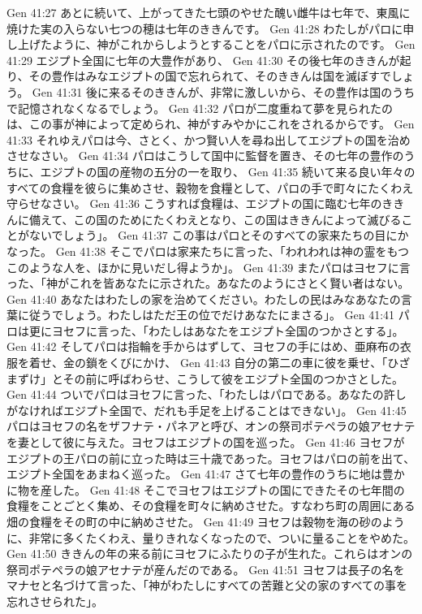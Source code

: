 Gen 41:27  あとに続いて、上がってきた七頭のやせた醜い雌牛は七年で、東風に焼けた実の入らない七つの穂は七年のききんです。
Gen 41:28  わたしがパロに申し上げたように、神がこれからしようとすることをパロに示されたのです。
Gen 41:29  エジプト全国に七年の大豊作があり、
Gen 41:30  その後七年のききんが起り、その豊作はみなエジプトの国で忘れられて、そのききんは国を滅ぼすでしょう。
Gen 41:31  後に来るそのききんが、非常に激しいから、その豊作は国のうちで記憶されなくなるでしょう。
Gen 41:32  パロが二度重ねて夢を見られたのは、この事が神によって定められ、神がすみやかにこれをされるからです。
Gen 41:33  それゆえパロは今、さとく、かつ賢い人を尋ね出してエジプトの国を治めさせなさい。
Gen 41:34  パロはこうして国中に監督を置き、その七年の豊作のうちに、エジプトの国の産物の五分の一を取り、
Gen 41:35  続いて来る良い年々のすべての食糧を彼らに集めさせ、穀物を食糧として、パロの手で町々にたくわえ守らせなさい。
Gen 41:36  こうすれば食糧は、エジプトの国に臨む七年のききんに備えて、この国のためにたくわえとなり、この国はききんによって滅びることがないでしょう」。
Gen 41:37  この事はパロとそのすべての家来たちの目にかなった。
Gen 41:38  そこでパロは家来たちに言った、「われわれは神の霊をもつこのような人を、ほかに見いだし得ようか」。
Gen 41:39  またパロはヨセフに言った、「神がこれを皆あなたに示された。あなたのようにさとく賢い者はない。
Gen 41:40  あなたはわたしの家を治めてください。わたしの民はみなあなたの言葉に従うでしょう。わたしはただ王の位でだけあなたにまさる」。
Gen 41:41  パロは更にヨセフに言った、「わたしはあなたをエジプト全国のつかさとする」。
Gen 41:42  そしてパロは指輪を手からはずして、ヨセフの手にはめ、亜麻布の衣服を着せ、金の鎖をくびにかけ、
Gen 41:43  自分の第二の車に彼を乗せ、「ひざまずけ」とその前に呼ばわらせ、こうして彼をエジプト全国のつかさとした。
Gen 41:44  ついでパロはヨセフに言った、「わたしはパロである。あなたの許しがなければエジプト全国で、だれも手足を上げることはできない」。
Gen 41:45  パロはヨセフの名をザフナテ・パネアと呼び、オンの祭司ポテペラの娘アセナテを妻として彼に与えた。ヨセフはエジプトの国を巡った。
Gen 41:46  ヨセフがエジプトの王パロの前に立った時は三十歳であった。ヨセフはパロの前を出て、エジプト全国をあまねく巡った。
Gen 41:47  さて七年の豊作のうちに地は豊かに物を産した。
Gen 41:48  そこでヨセフはエジプトの国にできたその七年間の食糧をことごとく集め、その食糧を町々に納めさせた。すなわち町の周囲にある畑の食糧をその町の中に納めさせた。
Gen 41:49  ヨセフは穀物を海の砂のように、非常に多くたくわえ、量りきれなくなったので、ついに量ることをやめた。
Gen 41:50  ききんの年の来る前にヨセフにふたりの子が生れた。これらはオンの祭司ポテペラの娘アセナテが産んだのである。
Gen 41:51  ヨセフは長子の名をマナセと名づけて言った、「神がわたしにすべての苦難と父の家のすべての事を忘れさせられた」。
